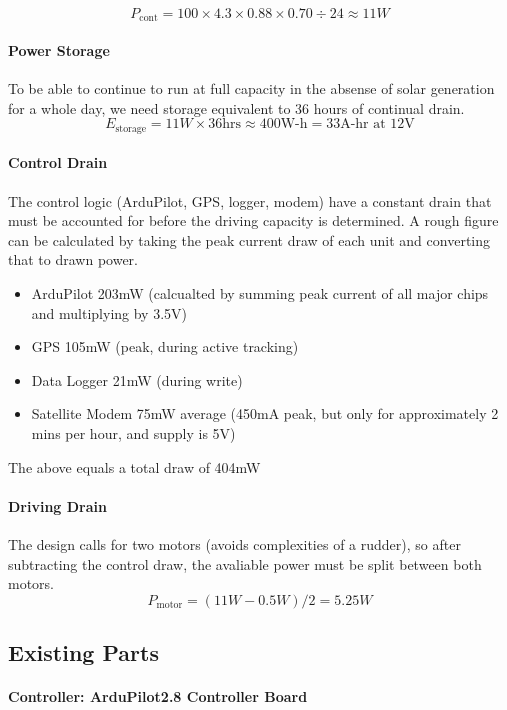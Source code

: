 $$
P_{\text{cont}} = 100 \times 4.3 \times 0.88 \times 0.70 \div 24 \approx 11W
$$

\paragraph{Power Storage}
To be able to continue to run at full capacity in the absense of solar generation for a whole day, we need storage equivalent to 36 hours of continual drain.
$$
E_{\text{storage}} = 11W \times 36\text{hrs} \approx 400\text{W-h} = 33\text{A-hr at 12V}
$$

\paragraph{Control Drain}
The control logic (ArduPilot, GPS, logger, modem) have a constant drain that must be accounted for before the driving capacity is determined. A rough figure can be calculated by taking the peak current draw of each unit and converting that to drawn power.
\begin{itemize}
\item{ArduPilot} 203mW (calcualted by summing peak current of all major chips and multiplying by 3.5V)
\item{GPS} 105mW (peak, during active tracking)
\item{Data Logger} 21mW (during write)
\item{Satellite Modem} 75mW average (450mA peak, but only for approximately 2 mins per hour, and supply is 5V)
\end{itemize}
The above equals a total draw of 404mW

\paragraph{Driving Drain}
The design calls for two motors (avoids complexities of a rudder), so after subtracting the control draw, the avaliable power must be split between both motors.
$$
P_{\text{motor}} = \left(11W - 0.5W\right) / 2 = 5.25W
$$

\subsection{Existing Parts}

\paragraph{Controller: ArduPilot2.8 Controller Board}

